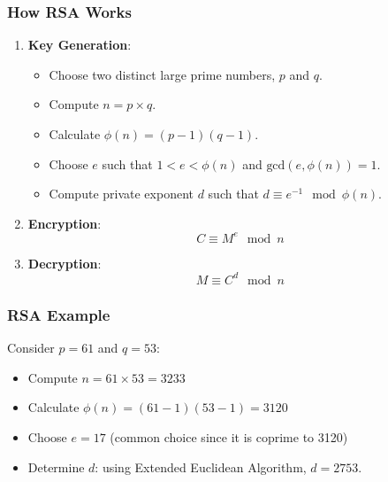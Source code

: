 \documentclass{beamer}
\begin{document}
\begin{frame}[fragile]
    \frametitle{How RSA Works}
    \begin{enumerate}
        \item \textbf{Key Generation}:
        \begin{itemize}
            \item Choose two distinct large prime numbers, \( p \) and \( q \).
            \item Compute \( n = p \times q \).
            \item Calculate \( \phi(n) = (p-1)(q-1) \).
            \item Choose \( e \) such that \( 1 < e < \phi(n) \) and \( \text{gcd}(e, \phi(n)) = 1 \).
            \item Compute private exponent \( d \) such that \( d \equiv e^{-1} \mod \phi(n) \).
        \end{itemize}

        \item \textbf{Encryption}:
        \[
        C \equiv M^e \mod n
        \]
        
        \item \textbf{Decryption}:
        \[
        M \equiv C^d \mod n
        \]
    \end{enumerate}
\end{frame}

\begin{frame}[fragile]
    \frametitle{RSA Example}
    Consider \( p = 61 \) and \( q = 53 \):
    \begin{itemize}
        \item Compute \( n = 61 \times 53 = 3233 \)
        \item Calculate \( \phi(n) = (61-1)(53-1) = 3120 \)
        \item Choose \( e = 17 \) (common choice since it is coprime to 3120)
        \item Determine \( d \): using Extended Euclidean Algorithm, \( d = 2753 \).
    \end{itemize}
\end{frame}
\end{document}
